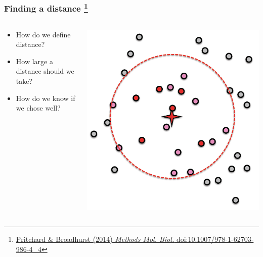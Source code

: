 \begin{frame}
  \frametitle{Finding a distance
  \footnote{\tiny{\href{http://dx.doi.org/10.1007/978-1-62703-986-4_4}{Pritchard \& Broadhurst (2014) \textit{Methods Mol. Biol.} doi:10.1007/978-1-62703-986-4\_4}}}
}
  \begin{columns}[T]
    \begin{column}{5cm}  
      \begin{itemize}  
        \item \textcolor{hutton_green}{How do we define distance?}
        \item \textcolor{hutton_blue}{How large a distance should we take?}
        \item \textcolor{hutton_purple}{How do we know if we chose well?}
        \end{itemize}  
      \end{column}
    \begin{column}{5cm}  
      \includegraphics[width=1\textwidth,valign=b]{images/finding_effectors4}    
    \end{column}
  \end{columns}  
\end{frame}

